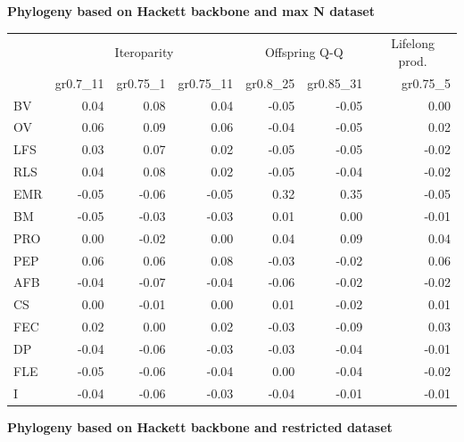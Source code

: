 \begin{landscape}
\begin{table}
\begin{footnotesize}
\textbf{Phylogeny based on Hackett backbone and max N dataset}

\begin{tabular}{@{}l|rrr|rr|r@{}}
\toprule
 & \multicolumn{3}{c|}{Iteroparity} & \multicolumn{2}{c|}{Offspring Q-Q} & \multicolumn{1}{c}{Lifelong prod.}\\
 & gr0.7\_11 & gr0.75\_1 & gr0.75\_11 & gr0.8\_25 & gr0.85\_31 & gr0.75\_5\\
\midrule
BV & 0.04 & 0.08 & 0.04 & -0.05 & -0.05 & 0.00\\
OV & 0.06 & 0.09 & 0.06 & -0.04 & -0.05 & 0.02\\
LFS & 0.03 & 0.07 & 0.02 & -0.05 & -0.05 & -0.02\\
RLS & 0.04 & 0.08 & 0.02 & -0.05 & -0.04 & -0.02\\
EMR & -0.05 & -0.06 & -0.05 & 0.32 & 0.35 & -0.05\\
BM & -0.05 & -0.03 & -0.03 & 0.01 & 0.00 & -0.01\\
PRO & 0.00 & -0.02 & 0.00 & 0.04 & 0.09 & 0.04\\
PEP & 0.06 & 0.06 & 0.08 & -0.03 & -0.02 & 0.06\\
AFB & -0.04 & -0.07 & -0.04 & -0.06 & -0.02 & -0.02\\
CS & 0.00 & -0.01 & 0.00 & 0.01 & -0.02 & 0.01\\
FEC & 0.02 & 0.00 & 0.02 & -0.03 & -0.09 & 0.03\\
DP & -0.04 & -0.06 & -0.03 & -0.03 & -0.04 & -0.01\\
FLE & -0.05 & -0.06 & -0.04 & 0.00 & -0.04 & -0.02\\
I & -0.04 & -0.06 & -0.03 & -0.04 & -0.01 & -0.01\\
\bottomrule
\end{tabular}

\textbf{Phylogeny based on Hackett backbone and restricted dataset}


\end{footnotesize}
\end{table}
\end{landscape}
